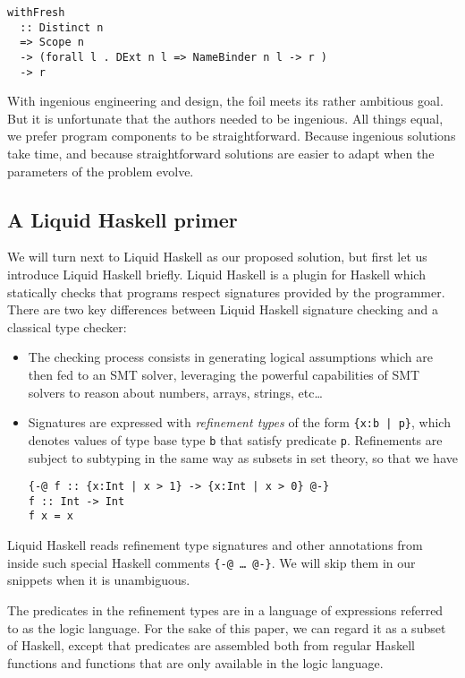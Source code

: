 \documentclass[sigconf, anonymous, review]{acmart}
\newcommand{\tc}[1]{{\small\texttt{#1}}}
\begin{document}
\begin{verbatim}
withFresh
  :: Distinct n
  => Scope n
  -> (forall l . DExt n l => NameBinder n l -> r )
  -> r
\end{verbatim}

With ingenious engineering and design, the foil meets its rather ambitious goal.
But it is unfortunate that the authors needed to be ingenious. All things equal,
we prefer program components to be straightforward. Because ingenious solutions
take time, and because straightforward solutions are easier to adapt when the
parameters of the problem evolve.


\subsection{A Liquid Haskell primer}

We will turn next to Liquid Haskell as our proposed solution, but first let us
introduce Liquid Haskell briefly.
Liquid Haskell is a
plugin for Haskell which statically checks that programs respect signatures
provided by the programmer. There are two key differences between Liquid Haskell
signature checking and a classical type checker:

\begin{itemize}
  \item The checking process consists in generating logical assumptions which
        are then fed to an SMT solver, leveraging the powerful
        capabilities of SMT solvers to reason about numbers, arrays, strings, etc…
  \item Signatures are expressed with \emph{refinement types} of the form
        \tc{\{x:b | p\}}, which denotes values of type
        base type \tc{b} that satisfy predicate \tc{p}.
        Refinements are subject to subtyping in the same way as subsets in set
        theory, so that we have
\begin{verbatim}
{-@ f :: {x:Int | x > 1} -> {x:Int | x > 0} @-}
f :: Int -> Int
f x = x
\end{verbatim}
\end{itemize}

Liquid Haskell reads refinement type signatures and other annotations from
inside such special Haskell comments
\tc{\{-@ \ldots\ @-\}}. We will skip them in our snippets when it is unambiguous.

The predicates in the refinement types are in a language of expressions
referred to as the logic language. For the sake of this paper, we can
regard it as a subset of Haskell, except that predicates are assembled both from
regular Haskell functions and functions that are
only available in the logic language.
\end{document}
